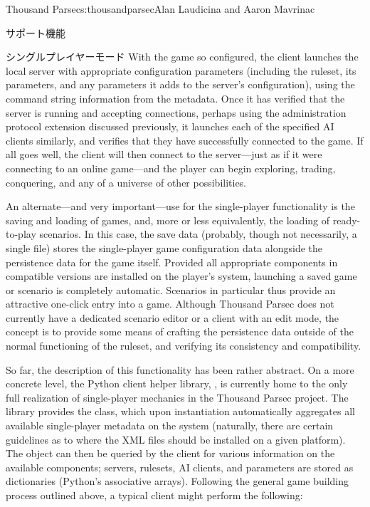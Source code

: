 \begin{aosachapter}{Thousand Parsec}{s:thousandparsec}{Alan Laudicina and Aaron Mavrinac}
\begin{aosasect1}{サポート機能}
\begin{aosasect2}{シングルプレイヤーモード}
With the game so configured, the client launches the local server with
appropriate configuration parameters (including the ruleset, its
parameters, and any parameters it adds to the server's configuration),
using the command string information from the metadata. Once it has
verified that the server is running and accepting connections, perhaps
using the administration protocol extension discussed previously, it
launches each of the specified AI clients similarly, and verifies that
they have successfully connected to the game. If all goes well, the
client will then connect to the server---just as if it were connecting
to an online game---and the player can begin exploring, trading,
conquering, and any of a universe of other possibilities.

An alternate---and very important---use for the single-player
functionality is the saving and loading of games, and, more or less
equivalently, the loading of ready-to-play scenarios. In this case,
the save data (probably, though not necessarily, a single file) stores
the single-player game configuration data alongside the persistence
data for the game itself. Provided all appropriate components in
compatible versions are installed on the player's system, launching a
saved game or scenario is completely automatic. Scenarios in
particular thus provide an attractive one-click entry into a
game. Although Thousand Parsec does not currently have a dedicated
scenario editor or a client with an edit mode, the concept is to
provide some means of crafting the persistence data outside of the
normal functioning of the ruleset, and verifying its consistency and
compatibility.

So far, the description of this functionality has been rather
abstract. On a more concrete level, the Python client helper library,
, is currently home to the only full realization
of single-player mechanics in the Thousand Parsec project. The library
provides the  class, which upon instantiation
automatically aggregates all available single-player metadata on the
system (naturally, there are certain guidelines as to where the XML
files should be installed on a given platform). The object can then be
queried by the client for various information on the available
components; servers, rulesets, AI clients, and parameters are stored
as dictionaries (Python's associative arrays). Following the general
game building process outlined above, a typical client might perform
the following:

\begin{aosaenumerate}


\end{aosaenumerate}
\end{aosasect2}
\end{aosasect1}
\end{aosachapter}
